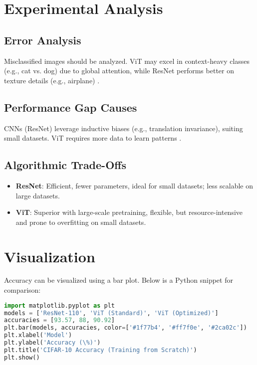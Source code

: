 \documentclass[UTF8]{report}
\theoremstyle{MyLineTheoremStyle} %
\theoremstyle{MyBlockTheoremStyle} %
\theoremstyle{MySubsubsectionStyle} %
\begin{document}
\section*{Experimental Analysis}
\subsection*{Error Analysis}
Misclassified images should be analyzed. ViT may excel in context-heavy classes (e.g., cat vs. dog) due to global attention, while ResNet performs better on texture details (e.g., airplane) \cite{kentaroy47vit}.

\subsection*{Performance Gap Causes}
CNNs (ResNet) leverage inductive biases (e.g., translation invariance), suiting small datasets. ViT requires more data to learn patterns \cite{lightningvit}.

\subsection*{Algorithmic Trade-Offs}
\begin{itemize}
    \item \textbf{ResNet}: Efficient, fewer parameters, ideal for small datasets; less scalable on large datasets.
    \item \textbf{ViT}: Superior with large-scale pretraining, flexible, but resource-intensive and prone to overfitting on small datasets.
\end{itemize}

\section*{Visualization}
Accuracy can be visualized using a bar plot. Below is a Python snippet for comparison:

\begin{lstlisting}[language=Python]
import matplotlib.pyplot as plt
models = ['ResNet-110', 'ViT (Standard)', 'ViT (Optimized)']
accuracies = [93.57, 88, 90.92]
plt.bar(models, accuracies, color=['#1f77b4', '#ff7f0e', '#2ca02c'])
plt.xlabel('Model')
plt.ylabel('Accuracy (\%)')
plt.title('CIFAR-10 Accuracy (Training from Scratch)')
plt.show()
\end{lstlisting}
\end{document}
